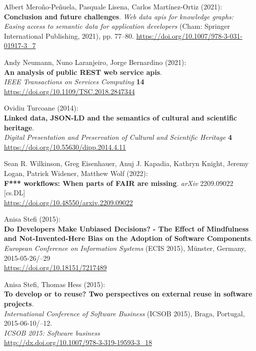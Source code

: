 \begin{thebibliography}{9}
Albert Meroño-Peñuela, Pasquale Lisena, Carlos Martínez-Ortiz (2021):
\textbf{Conclusion and future challenges}. \emph{Web data apis for
knowledge graphs: {Easing} access to semantic data for application
developers} ({Cham}: {Springer International Publishing}, 2021), pp.
77--80.
\url{https://doi.org/10.1007/978-3-031-01917-3_7}

Andy Neumann, Nuno Laranjeiro, Jorge Bernardino (2021): \\
\textbf{An analysis of public {REST} web service apis}.\\
\emph{IEEE Transactions on Services Computing} \textbf{14}
\url{https://doi.org/10.1109/TSC.2018.2847344}

Ovidiu Turcoane (2014): \\
\textbf{Linked data, {JSON-LD} and the semantics of cultural and scientific heritage}. \\
\emph{Digital Presentation and Preservation of Cultural and Scientific Heritage} \textbf{4} \\
\url{https://doi.org/10.55630/dipp.2014.4.11}

Sean R. Wilkinson, Greg Eisenhauer, Anuj J. Kapadia, Kathryn Knight,
Jeremy Logan, Patrick Widener, Matthew Wolf (2022): \\
\textbf{F*** workflows: When parts of {FAIR} are missing}. 
\emph{arXiv} 2209.09022 [cs.DL] \\
\url{https://doi.org/10.48550/arxiv.2209.09022}

Anisa Stefi (2015): \\
\textbf{Do Developers Make Unbiased Decisions? - The Effect of Mindfulness and Not-Invented-Here Bias on the Adoption of Software Components}. \\
\emph{European Conference on Information Systems} (ECIS 2015), Münster, Germany, 2015-05-26/--29 \\
\url{https://doi.org/10.18151/7217489}

Anisa Stefi, Thomas Hess (2015): \\
\textbf{To develop or to reuse? Two perspectives on external reuse in software projects}. \\
\emph{International Conference of Software Business} (ICSOB 2015), Braga, Portugal, 2015-06-10/--12.\\
\emph{ICSOB 2015: Software business} \\
\url{http://dx.doi.org/10.1007/978-3-319-19593-3_18}


\end{thebibliography}
